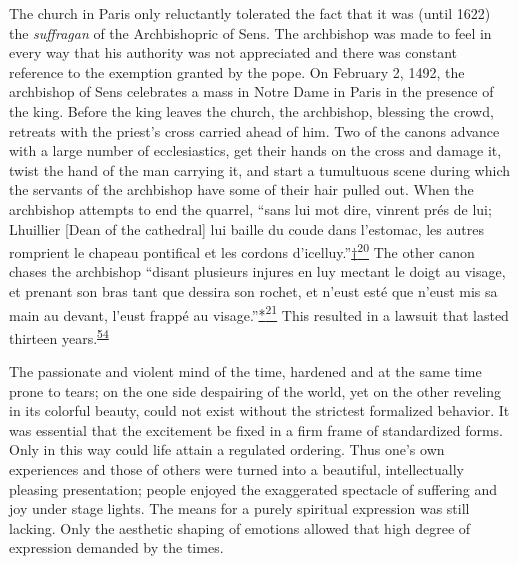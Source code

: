 The church in Paris only reluctantly tolerated the fact that it was
(until 1622) the \emph{suffragan} of the Archbishopric of Sens. The
archbishop was made to feel in every way that his authority was not
appreciated and there was constant reference to the exemption granted by
the pope. On February 2, 1492, the archbishop of Sens celebrates a mass
in Notre Dame in Paris in the presence of the king. Before the king
leaves the church, the archbishop, blessing the crowd, retreats with the
priest's cross carried ahead of him. Two of the canons advance with a
large number of ecclesiastics, get their hands on the cross and damage
it, twist the hand of the man carrying it, and start a tumultuous scene
during which the servants of the archbishop have some of their hair
pulled out. When the archbishop attempts to end the quarrel, ``sans lui
mot dire, vinrent prés de lui; Lhuillier {[}Dean of the cathedral{]} lui
baille du coude dans l'estomac, les autres romprient le chapeau
pontifical et les cordons
d'icelluy.''\protect\hypertarget{09_Chapter_Two__THE_CRAVING_FOR_A_M.xhtmlux5cux23id_2448}{\protect\hyperlink{23_NOTES.xhtmlux5cux23id_2447}{†\textsuperscript{20}}}
The other canon chases the archbishop ``disant plusieurs injures en luy
mectant le doigt au visage, et prenant son bras tant que dessira son
rochet, et n'eust esté que n'eust mis
\protect\hypertarget{09_Chapter_Two__THE_CRAVING_FOR_A_M.xhtmlux5cux23page_53}{}{}sa
main au devant, l'eust frappé au
visage.''\protect\hypertarget{09_Chapter_Two__THE_CRAVING_FOR_A_M.xhtmlux5cux23id_2449}{\protect\hyperlink{23_NOTES.xhtmlux5cux23id_2450}{*\textsuperscript{21}}}
This resulted in a lawsuit that lasted thirteen
years.\textsuperscript{\protect\hypertarget{09_Chapter_Two__THE_CRAVING_FOR_A_M.xhtmlux5cux23id_1980}{\protect\hyperlink{23_NOTES.xhtmlux5cux23id_1981}{54}}}

The passionate and violent mind of the time, hardened and at the same
time prone to tears; on the one side despairing of the world, yet on the
other reveling in its colorful beauty, could not exist without the
strictest formalized behavior. It was essential that the excitement be
fixed in a firm frame of standardized forms. Only in this way could life
attain a regulated ordering. Thus one's own experiences and those of
others were turned into a beautiful, intellectually pleasing
presentation; people enjoyed the exaggerated spectacle of suffering and
joy under stage lights. The means for a purely spiritual expression was
still lacking. Only the aesthetic shaping of emotions allowed that high
degree of expression demanded by the times.

